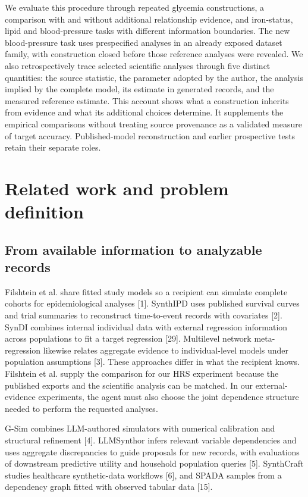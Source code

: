 \documentclass[11pt,letterpaper]{article}
\begin{document}
We evaluate this procedure through repeated glycemia constructions, a comparison with and without additional relationship evidence, and iron-status, lipid and blood-pressure tasks with different information boundaries. The new blood-pressure task uses prespecified analyses in an already exposed dataset family, with construction closed before those reference analyses were revealed. We also retrospectively trace selected scientific analyses through five distinct quantities: the source statistic, the parameter adopted by the author, the analysis implied by the complete model, its estimate in generated records, and the measured reference estimate. This account shows what a construction inherits from evidence and what its additional choices determine. It supplements the empirical comparisons without treating source provenance as a validated measure of target accuracy. Published-model reconstruction and earlier prospective tests retain their separate roles.


\section{Related work and problem definition}

\subsection{From available information to analyzable records}

Filshtein et al. share fitted study models so a recipient can simulate complete cohorts for epidemiological analyses [1]. SynthIPD uses published survival curves and trial summaries to reconstruct time-to-event records with covariates [2]. SynDI combines internal individual data with external regression information across populations to fit a target regression [29]. Multilevel network meta-regression likewise relates aggregate evidence to individual-level models under population assumptions [3]. These approaches differ in what the recipient knows. Filshtein et al. supply the comparison for our HRS experiment because the published exports and the scientific analysis can be matched. In our external-evidence experiments, the agent must also choose the joint dependence structure needed to perform the requested analyses.


G-Sim combines LLM-authored simulators with numerical calibration and structural refinement [4]. LLMSynthor infers relevant variable dependencies and uses aggregate discrepancies to guide proposals for new records, with evaluations of downstream predictive utility and household population queries [5]. SynthCraft studies healthcare synthetic-data workflows [6], and SPADA samples from a dependency graph fitted with observed tabular data [15].
\end{document}
